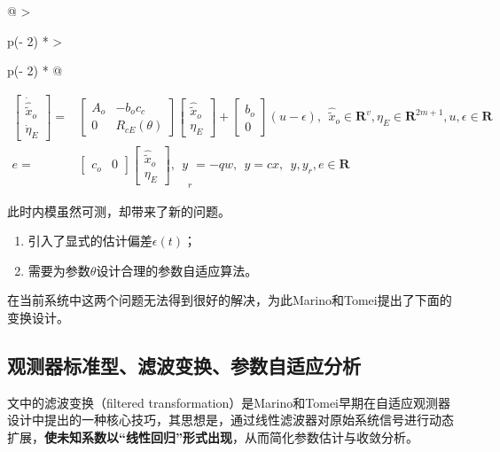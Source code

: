 \documentclass[
  12pt,
  a4paper
]{article}
\begin{document}
\begin{longtable}[]{@{}
  >{\raggedright\arraybackslash}p{}
  >{\raggedright\arraybackslash}p{}@{}}
{\(\begin{aligned}
\begin{bmatrix}
{\dot{\widehat{\widetilde{x}}}}_{o} \\
{\dot{\eta}}_{E}
\end{bmatrix} = & \begin{bmatrix}
A_{o} & - b_{o}c_{c} \\
0 & R_{cE}(\theta)
\end{bmatrix}\begin{bmatrix}
{\widehat{\widetilde{x}}}_{o} \\
\eta_{E}
\end{bmatrix} + \begin{bmatrix}
b_{o} \\
0
\end{bmatrix}(u - \epsilon),\ \ {\widehat{\widetilde{x}}}_{o} \in \mathbf{R}^{v},\eta_{E} \in \mathbf{R}^{2m + 1},u,\epsilon \in \mathbf{R} \\
e = & {\begin{bmatrix}
c_{o} & 0
\end{bmatrix}\begin{bmatrix}
{\widehat{\widetilde{x}}}_{o} \\
\eta_{E}
\end{bmatrix},\ \ y}_{r} = - qw,\ \ y = cx,\ \ y,y_{r},e \in \mathbf{R}
\end{aligned}\)} \\
\end{longtable}

此时内模虽然可测，却带来了新的问题。

\begin{enumerate}
\def\labelenumi{\arabic{enumi}.}
\item
  引入了显式的估计偏差\(\epsilon(t)\)；
\item
  需要为参数\(\theta\)设计合理的参数自适应算法。
\end{enumerate}

在当前系统中这两个问题无法得到很好的解决，为此Marino和Tomei提出了下面的变换设计。

\subsection{观测器标准型、滤波变换、参数自适应分析}\label{ux89c2ux6d4bux5668ux6807ux51c6ux578bux6ee4ux6ce2ux53d8ux6362ux53c2ux6570ux81eaux9002ux5e94ux5206ux6790}

文中的滤波变换（filtered
transformation）是Marino和Tomei早期在自适应观测器设计中提出的一种核心技巧，其思想是，通过线性滤波器对原始系统信号进行动态扩展，\textbf{使未知系数以``线性回归''形式出现}，从而简化参数估计与收敛分析。
\end{document}
